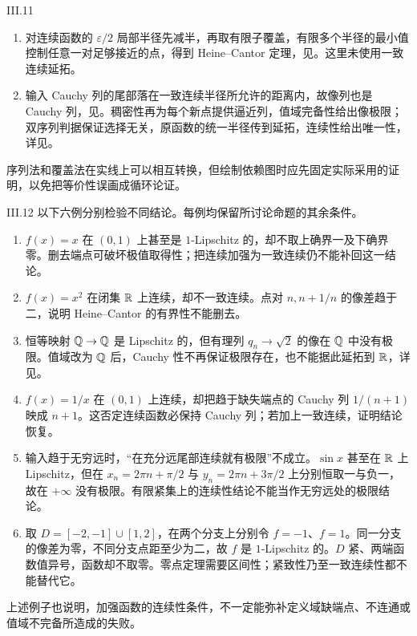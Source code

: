 \begin{solution}{III.11}
\begin{enumerate}
 \item 对连续函数的 \(\varepsilon/2\) 局部半径先减半，再取有限子覆盖，有限多个半径的最小值控制任意一对足够接近的点，得到 Heine--Cantor 定理，见。这里未使用一致连续延拓。
 \item 输入 Cauchy 列的尾部落在一致连续半径所允许的距离内，故像列也是 Cauchy 列，见。稠密性再为每个新点提供逼近列，值域完备性给出像极限；双序列判据保证选择无关，原函数的统一半径传到延拓，连续性给出唯一性，详见。
\end{enumerate}
序列法和覆盖法在实线上可以相互转换，但绘制依赖图时应先固定实际采用的证明，以免把等价性误画成循环论证。
\end{solution}

\begin{solution}{III.12}
以下六例分别检验不同结论。每例均保留所讨论命题的其余条件。
\begin{enumerate}
 \item \(f(x)=x\) 在 \((0,1)\) 上甚至是 \(1\)-Lipschitz 的，却不取上确界一及下确界零。删去端点可破坏极值取得性；把连续加强为一致连续仍不能补回这一结论。
 \item \(f(x)=x^2\) 在闭集 \(\mathbb{R}\) 上连续，却不一致连续。点对 \(n,n+1/n\) 的像差趋于二，说明 Heine--Cantor 的有界性不能删去。
 \item 恒等映射 \(\mathbb{Q}\to\mathbb{Q}\) 是 Lipschitz 的，但有理列 \(q_n\to\sqrt2\) 的像在 \(\mathbb{Q}\) 中没有极限。值域改为 \(\mathbb{Q}\) 后，Cauchy 性不再保证极限存在，也不能据此延拓到 \(\mathbb{R}\)，详见。
 \item \(f(x)=1/x\) 在 \((0,1)\) 上连续，却把趋于缺失端点的 Cauchy 列 \(1/(n+1)\) 映成 \(n+1\)。这否定连续函数必保持 Cauchy 列；若加上一致连续，证明结论恢复。
 \item 输入趋于无穷远时，“在充分远尾部连续就有极限”不成立。\(\sin x\) 甚至在 \(\mathbb{R}\) 上 Lipschitz，但在 \(x_n=2\pi n+\pi/2\) 与 \(y_n=2\pi n+3\pi/2\) 上分别恒取一与负一，故在 \(+\infty\) 没有极限。有限紧集上的连续性结论不能当作无穷远处的极限结论。
 \item 取 \(D=[-2,-1]\cup[1,2]\)，在两个分支上分别令 \(f=-1\)、\(f=1\)。同一分支的像差为零，不同分支点距至少为二，故 \(f\) 是 \(1\)-Lipschitz 的。\(D\) 紧、两端函数值异号，函数却不取零。零点定理需要区间性；紧致性乃至一致连续性都不能替代它。
\end{enumerate}
上述例子也说明，加强函数的连续性条件，不一定能弥补定义域缺端点、不连通或值域不完备所造成的失败。
\end{solution}
